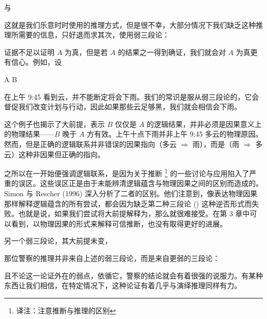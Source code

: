 与

\placeformula[syllogism-2]
\startformula
{}
\stopformula

这就是我们乐意时时使用的推理方式，但是很不幸，大部分情况下我们缺乏这种推理所需要的信息，只好退而求其次，使用弱三段论：

\placeformula[weak-1]
\startformula
{}
\stopformula

证据不足以证明 $A$ 为真，但是若 $A$ 的结果之一得到确证，我们就会对 $A$ 为真更有信心。例如，设

\startformula
\startalign
\NC A\equiv\NC{}\NR
\NC B\equiv\NC{}\NR
\stopalign
\stopformula

在上午 9:45 看到云，并不能断定将会下雨。我们的常识是服从弱三段论的，它会督促我们改变计划与行动，因此如果那些云足够黑，我们就会相信会下雨。

这个例子也揭示了大前提，表示 $B$ 仅仅是 $A$ 的逻辑结果，并非必须是因果意义上的物理结果——$B$ 晚于 $A$ 方有效。上午十点下雨并非上午 9:45 多云的物理原因。然而，但是正确的逻辑联系并非错误的因果指向（多云 $\Rightarrow$ 雨），而是（雨 $\Rightarrow$ 多云）这种非因果但正确的指向。

之所以在一开始便强调逻辑联系，是因为关于推断 \footnote{译注：注意推断与推理的区别} 的一些讨论与应用陷入了严重的误区。这些误区正是由于未能辨清逻辑蕴含与物理因果之间的区别而造成的。Simon 与 Rescher (1996) 深入分析了二者的区别。他们注意到，像表达物理因果那样解释逻辑蕴含的所有尝试，都会因为缺乏第二种三段论 (\in[syllogism-2]) 这种逆否形式而失败。也就是说，如果我们尝试将大前提解释为，那么就很难接受。在第 3 章中可以看到，以物理因果的形式来解释可信推断，也没有取得更好的进展。

另一个弱三段论，其大前提未变，

\placeformula[weak-2]
\startformula
{}
\stopformula

那位警察的推理并非来自上述的弱三段论，而是来自更弱的三段论：

\placeformula[weak-3]
\startformula
{}
\stopformula

且不论这一论证外在的弱点，依循它，警察的结论就会有着很强的说服力。有某种东西让我们相信，在特定情况下，这种论证有着几乎与演绎推理同样有力。

